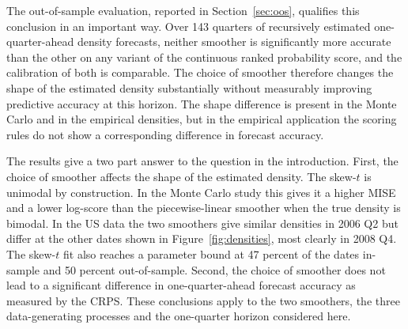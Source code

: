 \documentclass[12pt]{report} %
\begin{document}
The out-of-sample evaluation, reported in Section~\ref{sec:oos}, qualifies this conclusion in an important way. Over 143 quarters of recursively estimated one-quarter-ahead density forecasts, neither smoother is significantly more accurate than the other on any variant of the continuous ranked probability score, and the calibration of both is comparable. The choice of smoother therefore changes the shape of the estimated density substantially without measurably improving predictive accuracy at this horizon. The shape difference is present in the Monte Carlo and in the empirical densities, but in the empirical application the scoring rules do not show a corresponding difference in forecast accuracy.

The results give a two part answer to the question in the introduction. First, the choice of smoother affects the shape of the estimated density. The skew-$t$ is unimodal by construction. In the Monte Carlo study this gives it a higher MISE and a lower log-score than the piecewise-linear smoother when the true density is bimodal. In the US data the two smoothers give similar densities in 2006 Q2 but differ at the other dates shown in Figure~\ref{fig:densities}, most clearly in 2008 Q4. The skew-$t$ fit also reaches a parameter bound at 47 percent of the dates in-sample and 50 percent out-of-sample. Second, the choice of smoother does not lead to a significant difference in one-quarter-ahead forecast accuracy as measured by the CRPS. These conclusions apply to the two smoothers, the three data-generating processes and the one-quarter horizon considered here.



\clearpage
{}

\printbibliography[title={References}]




\end{document}
